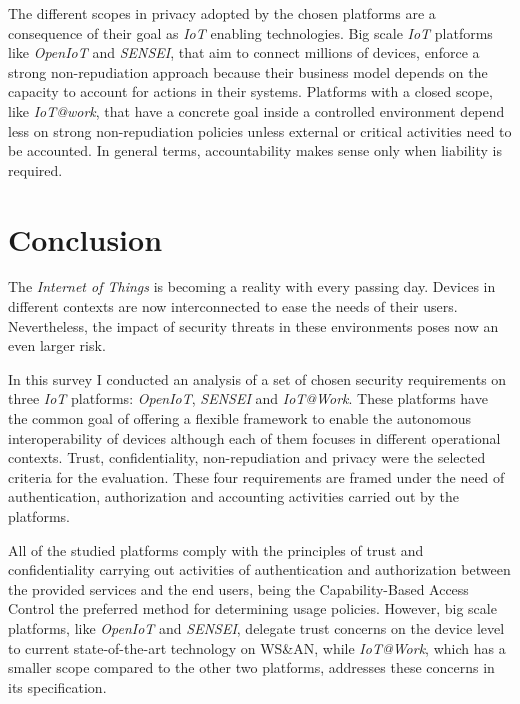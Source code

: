 \documentclass[journal]{IEEEtran}
\begin{document}
  The different scopes in privacy adopted by the chosen platforms are a consequence of their goal as \emph{IoT} enabling technologies. Big scale \emph{IoT} platforms like \emph{OpenIoT} and \emph{SENSEI}, that aim to connect millions of devices,  enforce a strong non-repudiation approach because their business model depends on the capacity to account for actions in their systems. Platforms with a closed scope, like \emph{IoT@work}, that have a concrete goal inside a controlled environment depend less on strong non-repudiation policies unless external or critical activities need to be accounted. In general terms, accountability makes sense only when liability is required.  

\section{Conclusion}
  The \emph{Internet of Things} is becoming a reality with every passing day. Devices in different contexts are now interconnected to ease the needs of their users. Nevertheless, the impact of security threats in these environments poses now an even larger risk.

  In this survey I conducted an analysis of a set of chosen security requirements on three \emph{IoT} platforms: \emph{OpenIoT}, \emph{SENSEI} and \emph{IoT@Work}. These platforms have the common goal of offering a flexible framework to enable the autonomous interoperability of devices although each of them focuses in different operational contexts. Trust, confidentiality, non-repudiation and privacy were the selected criteria for the evaluation. These four requirements are framed under the need of authentication, authorization and accounting activities carried out by the platforms.

  All of the studied platforms comply with the principles of trust and confidentiality carrying out activities of authentication and authorization between the provided services and the end users, being the Capability-Based Access Control the preferred method for determining usage policies. However, big scale platforms, like \emph{OpenIoT} and \emph{SENSEI}, delegate trust concerns on the device level to current state-of-the-art technology on WS\&AN, while \emph{IoT@Work}, which has a smaller scope compared to the other two platforms, addresses these concerns in its specification.
\end{document}
